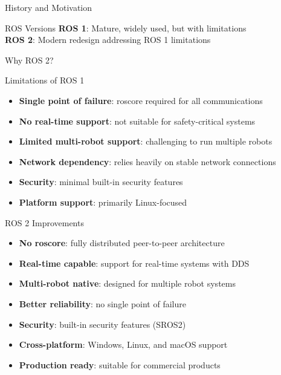 \begin{frame}[allowframebreaks]{History and Motivation}
    \begin{alertblock}{ROS Versions}
        \textbf{ROS 1}: Mature, widely used, but with limitations\\
        \textbf{ROS 2}: Modern redesign addressing ROS 1 limitations
    \end{alertblock}
\end{frame}

\begin{frame}[allowframebreaks]{Why ROS 2? }
    \begin{block}{Limitations of ROS 1}
        \begin{itemize}
            \item \textbf{Single point of failure}: roscore required for all communications
            \item \textbf{No real-time support}: not suitable for safety-critical systems
            \item \textbf{Limited multi-robot support}: challenging to run multiple robots
            \item \textbf{Network dependency}: relies heavily on stable network connections
            \item \textbf{Security}: minimal built-in security features
            \item \textbf{Platform support}: primarily Linux-focused
        \end{itemize}
    \end{block}

    \framebreak

    \begin{block}{ROS 2 Improvements}
        \begin{itemize}
            \item \textbf{No roscore}: fully distributed peer-to-peer architecture
            \item \textbf{Real-time capable}: support for real-time systems with DDS
            \item \textbf{Multi-robot native}: designed for multiple robot systems
            \item \textbf{Better reliability}: no single point of failure
            \item \textbf{Security}: built-in security features (SROS2)
            \item \textbf{Cross-platform}: Windows, Linux, and macOS support
            \item \textbf{Production ready}: suitable for commercial products
        \end{itemize}
    \end{block}
\end{frame}

